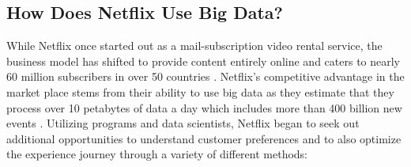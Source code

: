 \documentclass[sigconf]{acmart}
\begin{document}
\subsection{How Does Netflix Use Big Data?}
While Netflix once started out as a mail-subscription video rental service, the business model has shifted to provide content entirely online and caters to nearly 60 million subscribers in over 50 countries \cite{Jenkins2016}. Netflix's competitive advantage in the market place stems from their ability to use big data as they estimate that they process over 10 petabytes of data a day which includes more than 400 billion new events \cite{Jenkins2016}. Utilizing programs and data scientists, Netflix began to seek out additional opportunities to understand customer preferences and to also optimize the experience journey through a variety of different methods: 
\end{document}
